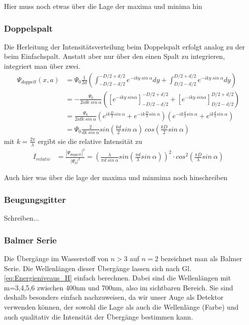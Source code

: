 \documentclass[]{article}
\begin{document}
Hier muss noch etwas über die Lage der maxima und minima hin
\subsubsection{Doppelspalt}
Die Herleitung der Intensitätsverteilung beim Doppelspalt erfolgt analog zu der beim Einfachspalt. Anstatt aber nur über den einen Spalt zu integrieren, integriert man über zwei. 
\begin{align}
	\Psi_{doppelt}(x,a)&=\Psi_{0}\frac{1}{2d}(\int_{-D/2-d/2}^{-D/2+d/2}e^{-iky \: sin \: \alpha}dy+\int_{D/2-d/2}^{D/2+d/2}e^{-iky \: sin \: \alpha}dy)\\
%
	&=-\frac{\Psi_{0}}{2idk \: sin \: \alpha}([e^{-iky \: sin \alpha}]_{-D/2-d/2}^{-D/2+d/2}+[e^{-iky \: sin \alpha}]_{D/2-d/2}^{D/2+d/2})\\
%
	&=\frac{\Psi_{0}}{2idk \: sin \: \alpha}(e^{ik\frac{D}{2} sin \: \alpha}+ e^{-ik\frac{D}{2} sin \: \alpha})(e^{-ik\frac{d}{2} sin \: \alpha}+ e^{ik\frac{d}{2} sin \: \alpha})\\
	&=\Psi_{0}\frac{2}{dk \: sin \: \alpha}sin (\frac{kd}{2} sin \: \alpha)\: cos(\frac{kD}{2}sin \: \alpha)
\end{align}
mit $k=\frac{2 \pi}{\lambda}$ ergibt sie die relative Intensität zu
\begin{align}
	I_{relativ}&=	\frac{|\Psi_{doppelt}|^2}{|\Psi_{0}|^2}=\left( \frac{\lambda}{\pi d \: sin \: \alpha}sin \left(  \frac{\pi d}{\lambda} sin \: \alpha \right)\right)^2 \cdot cos^2 \left( \frac{\pi D}{\lambda}sin \: \alpha \right) 
\end{align}

Auch hier was über die lage der maxima und minmima noch hinschreiben



\subsubsection{Beugungsgitter}
Schreiben...
\subsubsection{Balmer Serie}
Die Übergänge im Wasserstoff von $n>3$ auf $n=2$ bezeichnet man als Balmer Serie. Die Wellenlängen dieser Übergänge lassen sich nach Gl. \ref{eq:Energieniveaus_H} einfach berechnen. Dabei sind die Wellenlängen mit m=3,4,5,6 zwischen 400nm und 700nm, also im sichtbaren Bereich. Sie sind deshalb besonders einfach nachzuweisen, da wir unser Auge als Detektor verwenden können, der sowohl die Lage als auch die Wellenlänge (Farbe) und auch qualitativ die Intensität der Übergänge bestimmen kann.
\end{document}

